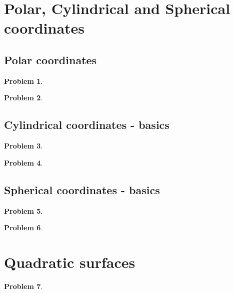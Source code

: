 \documentclass{article}
\newtheorem{problem}{Problem}
\begin{document}
\section{Polar, Cylindrical and Spherical coordinates}
\subsection{Polar coordinates}
\begin{problem}

\end{problem}



\begin{problem}

\end{problem}
\subsection{Cylindrical coordinates - basics}

\begin{problem}

\end{problem}

\begin{problem}

\end{problem}
\subsection{Spherical coordinates - basics}

\begin{problem}

\end{problem}

\begin{problem}

\end{problem}

\section{Quadratic surfaces}

\begin{problem}

\end{problem}
\end{document}
